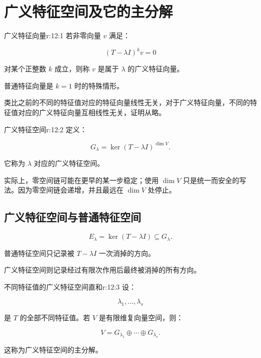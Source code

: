 
\chapter{广义特征空间及它的主分解}


\begin{jdefn}{广义特征向量}{r:12:1}
若非零向量 $v$ 满足：

\[
(T-\lambda I)^k v=0
\]

对某个正整数 $k$ 成立，则称 $v$ 是属于 $\lambda$ 的广义特征向量。

普通特征向量是 $k=1$ 时的特殊情形。

类比之前的不同的特征值对应的特征向量线性无关，对于广义特征向量，不同的特征值对应的广义特征向量互相线性无关，证明从略。
\end{jdefn}

\begin{jdefn}{广义特征空间}{r:12:2}
定义：

\[
G_\lambda
=
\ker(T-\lambda I)^{\dim V}.
\]

它称为 $\lambda$ 对应的广义特征空间。

实际上，零空间链可能在更早的某一步稳定；使用 $\dim V$ 只是统一而安全的写法。因为零空间链会递增，并且最远在 $\dim V$ 处停止。
\end{jdefn}

\section{广义特征空间与普通特征空间}

\[
E_\lambda
=
\ker(T-\lambda I)
\subseteq
G_\lambda.
\]

普通特征空间只记录被 $T-\lambda I$ 一次消掉的方向。

广义特征空间则记录经过有限次作用后最终被消掉的所有方向。

\begin{jthm}{不同特征值的广义特征空间直和}{r:12:3}
设：

\[
\lambda_1,\ldots,\lambda_s
\]

是 $T$ 的全部不同特征值。若 $V$ 是有限维复向量空间，则：

\[
V
=
G_{\lambda_1}\oplus\cdots\oplus G_{\lambda_s}.
\]

这称为广义特征空间的主分解。
\end{jthm}

